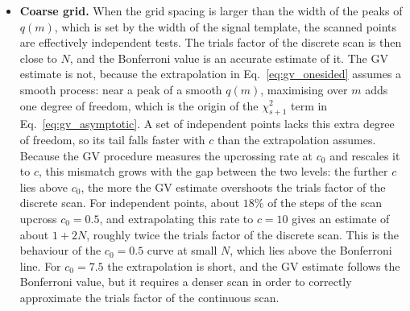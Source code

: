 \begin{itemize}
    \item {\bf Coarse grid.} When the grid spacing is larger than the width of the peaks of $q(m)$, which is set by the width of the signal template, the scanned points are effectively independent tests. The trials factor of the discrete scan is then close to $N$, and the Bonferroni value is an accurate estimate of it. The GV estimate is not, because the extrapolation in Eq.~\eqref{eq:gv_onesided} assumes a smooth process: near a peak of a smooth $q(m)$, maximising over $m$ adds one degree of freedom, which is the origin of the $\chi^2_{s+1}$ term in Eq.~\eqref{eq:gv_asymptotic}. A set of independent points lacks this extra degree of freedom, so its tail falls faster with $c$ than the extrapolation assumes. Because the GV procedure measures the upcrossing rate at $c_0$ and rescales it to $c$, this mismatch grows with the gap between the two levels: the further $c$ lies above $c_0$, the more the GV estimate overshoots the trials factor of the discrete scan. For independent points, about $18\%$ of the steps of the scan upcross $c_0=0.5$, and extrapolating this rate to $c=10$ gives an estimate of about $1+2N$, roughly twice the trials factor of the discrete scan. This is the behaviour of the $c_0=0.5$ curve at small $N$, which lies above the Bonferroni line. For $c_0=7.5$ the extrapolation is short, and the GV estimate follows the Bonferroni value, but it requires a denser scan in order to correctly approximate the trials factor of the continuous scan.

\end{itemize}
